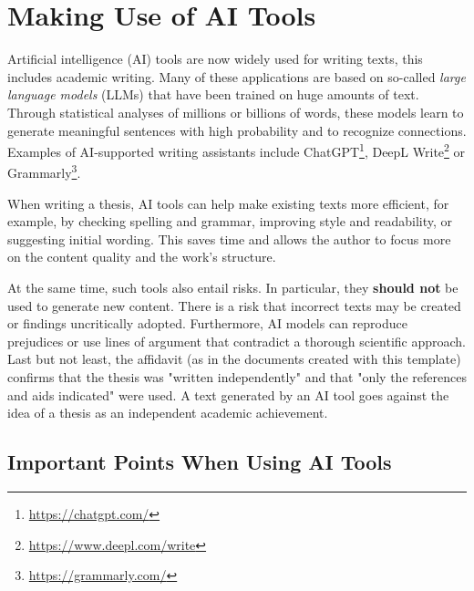 \section{Making Use of AI Tools}

Artificial intelligence (AI) tools are now widely used for writing texts, this
includes academic writing. Many of these applications are based on so-called
\emph{large language models} (LLMs) that have been trained on huge amounts of text.
Through statistical analyses of millions or billions of words, these models
learn to generate meaningful sentences with high probability and to recognize
connections. Examples of AI-supported writing assistants include 
ChatGPT\footnote{\url{https://chatgpt.com/}},
DeepL Write\footnote{\url{https://www.deepl.com/write}} or 
Grammarly\footnote{\url{https://grammarly.com/}}.

When writing a thesis, AI tools can help make existing texts more efficient,
for example, by checking spelling and grammar, improving style and readability,
or suggesting initial wording. This saves time and allows the author to focus
more on the content quality and the work's structure.

At the same time, such tools also entail risks. In particular, they
\textbf{should not} be used to generate new content. There is a risk that
incorrect texts may be created or findings uncritically adopted. Furthermore,
AI models can reproduce prejudices or use lines of argument that contradict a
thorough scientific approach. Last but not least, the affidavit (as in the
documents created with this template) confirms that the thesis was "written
independently" and that "only the references and aids indicated" were used.
A text generated by an AI tool goes against the idea of a thesis as an
independent academic achievement.

\subsection{Important Points When Using AI Tools}


